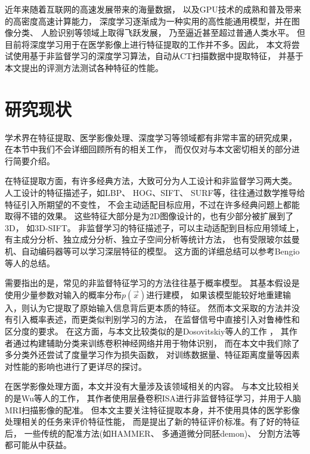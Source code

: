 近年来随着互联网的高速发展带来的海量数据，
以及GPU技术的成熟和普及带来的高密度高速计算能力，
深度学习逐渐成为一种实用的高性能通用模型，并在图像分类\cite{he2015delving}、
人脸识别\cite{schroff2015facenet}等领域上取得飞跃发展，
乃至逼近甚至超过普通人类水平。
但目前将深度学习用于在医学影像上进行特征提取的工作并不多。因此，
本文将尝试使用基于非监督学习的深度学习算法，自动从CT扫描数据中提取特征，
并基于本文提出的评测方法测试各种特征的性能。

\section{研究现状}
学术界在特征提取、医学影像处理、深度学习等领域都有非常丰富的研究成果，
在本节中我们不会详细回顾所有的相关工作，
而仅仅对与本文密切相关的部分进行简要介绍。

在特征提取方面，有许多经典方法，大致可分为人工设计和非监督学习两大类。
人工设计的特征描述子，如LBP\cite{ojala1994performance}、
HOG\cite{dalal2005histograms}、SIFT\cite{lowe1999object}、
SURF\cite{bay2006surf}等，往往通过数学推导给特征引入所期望的不变性，
不会主动适配目标应用，不过在许多经典问题上都能取得不错的效果。
这些特征大部分是为2D图像设计的，也有少部分被扩展到了3D，
如3D-SIFT\cite{scovanner20073}。
非监督学习的特征描述子，可以主动适配到目标应用领域上，
有主成分分析、独立成分分析、独立子空间分析等统计方法，
也有受限玻尔兹曼机、自动编码器等可以学习深层特征的模型。
这方面的详细总结可以参考Bengio等人的总结\cite{bengio2013representation}。

需要指出的是，常见的非监督特征学习的方法往往基于概率模型。
其基本假设是使用少量参数对输入的概率分布$p(\vec{x})$进行建模，
如果该模型能较好地重建输入，则认为它提取了原始输入信息背后更本质的特征。
然而本文采取的方法并没有引入概率表述，而更类似判别学习的方法，
在监督信号中直接引入对鲁棒性和区分度的要求。
在这方面，与本文比较类似的是Dosovitskiy等人的工作
\cite{dosovitskiy2014discriminative}，
其作者通过构建辅助分类来训练卷积神经网络并用于物体识别，
而在本文中我们除了多分类外还尝试了度量学习作为损失函数，
对训练数据量、特征距离度量等因素对性能的影响也进行了更详尽的探讨。

在医学影像处理方面，本文并没有大量涉及该领域相关的内容。
与本文比较相关的是Wu等人的工作\cite{wu2013unsupervised}，
其作者使用层叠卷积ISA进行非监督特征学习，并用于人脑MRI扫描影像的配准。
但本文主要关注特征提取本身，并不使用具体的医学影像处理相关的任务来评价特征性能，
而是提出了新的特征评价标准。有了好的特征后，
一些传统的配准方法(如HAMMER\cite{shen2002hammer}、
多通道微分同胚demon\cite{peyrat2010registration})、
分割方法等都可能从中获益。

